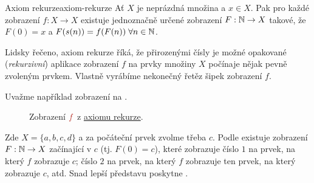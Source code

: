 \begin{proposition}{Axiom rekurze}{axiom-rekurze}
 Ať $X$ je neprázdná množina a $x \in X$. Pak pro každé zobrazení $f:X \to X$
 existuje jednoznačně určené zobrazení $F:\mathbb{N} \to X$ takové, že $F(0) = x$ a
 $F(s(n)) = f(F(n)) \; \forall n \in \mathbb{N}$.
\end{proposition}

Lidsky řečeno, axiom rekurze říká, že přirozenými čísly je možné 
opakované (\emph{rekurzivní}) aplikace zobrazení $f$ na prvky množiny $X$
počínaje nějak pevně zvoleným prvkem. Vlastně vyrábíme nekonečný řetěz šipek
zobrazení $f$.

Uvažme například zobrazení na .
\begin{figure}[ht]
 \centering

 \caption{Zobrazení $\clr{f}$ z \hyperref[prop:axiom-rekurze]{axiomu rekurze}.}
 \label{fig:zobrazeni-axiom-rekurze}
\end{figure}

Zde $X = \{a,b,c,d\}$ a za počáteční prvek zvolme třeba $c$. Podle
 existuje zobrazení $F:\mathbb{N} \to X$ začínající v
$c$ (tj. $F(0) = c$), které zobrazuje číslo $1$ na prvek, na který $f$ zobrazuje
$c$; číslo $2$ na prvek, na který $f$ zobrazuje ten prvek, na který zobrazuje
$c$, atd. Snad lepší představu poskytne
.

